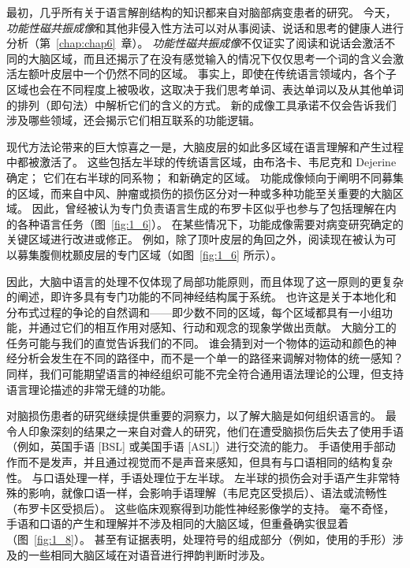 最初，几乎所有关于语言解剖结构的知识都来自对脑部病变患者的研究。
今天，\textit{功能性磁共振成像}和其他非侵入性方法可以对从事阅读、说话和思考的健康人进行分析（第~\ref{chap:chap6}~章）。
\textit{功能性磁共振成像}不仅证实了阅读和说话会激活不同的大脑区域，而且还揭示了在没有感觉输入的情况下仅仅思考一个词的含义会激活左额叶皮层中一个仍然不同的区域。
事实上，即使在传统语言领域内，各个子区域也会在不同程度上被吸收，这取决于我们思考单词、表达单词以及从其他单词的排列（即句法）中解析它们的含义的方式。
新的成像工具承诺不仅会告诉我们涉及哪些领域，还会揭示它们相互联系的功能逻辑。


现代方法论带来的巨大惊喜之一是，大脑皮层的如此多区域在语言理解和产生过程中都被激活了。
这些包括左半球的传统语言区域，由布洛卡、韦尼克和 Dejerine 确定； 它们在右半球的同系物；
和新确定的区域。
功能成像倾向于阐明不同募集的区域，而来自中风、肿瘤或损伤的损伤区分对一种或多种功能至关重要的大脑区域。
因此，曾经被认为专门负责语言生成的布罗卡区似乎也参与了包括理解在内的各种语言任务（图~\ref{fig:1_6}）。
在某些情况下，功能成像需要对病变研究确定的关键区域进行改进或修正。
例如，除了顶叶皮层的角回之外，阅读现在被认为可以募集腹侧枕颞皮层的专门区域（如图~\ref{fig:1_6} 所示）。


因此，大脑中语言的处理不仅体现了局部功能原则，而且体现了这一原则的更复杂的阐述，即许多具有专门功能的不同神经结构属于系统。
也许这是关于本地化和分布式过程的争论的自然调和——即少数不同的区域，每个区域都具有一小组功能，并通过它们的相互作用对感知、行动和观念的现象学做出贡献。
大脑分工的任务可能与我们的直觉告诉我们的不同。
谁会猜到对一个物体的运动和颜色的神经分析会发生在不同的路径中，而不是一个单一的路径来调解对物体的统一感知？
同样，我们可能期望语言的神经组织可能不完全符合通用语法理论的公理，但支持语言理论描述的非常无缝的功能。


对脑损伤患者的研究继续提供重要的洞察力，以了解大脑是如何组织语言的。
最令人印象深刻的结果之一来自对聋人的研究，他们在遭受脑损伤后失去了使用手语（例如，英国手语 [BSL] 或美国手语 [ASL]）进行交流的能力。
手语使用手部动作而不是发声，并且通过视觉而不是声音来感知，但具有与口语相同的结构复杂性。
与口语处理一样，手语处理位于左半球。 左半球的损伤会对手语产生非常特殊的影响，就像口语一样，会影响手语理解（韦尼克区受损后）、语法或流畅性（布罗卡区受损后）。
这些临床观察得到功能性神经影像学的支持。
毫不奇怪，手语和口语的产生和理解并不涉及相同的大脑区域，但重叠确实很显着（图~\ref{fig:1_8}）。
甚至有证据表明，处理符号的组成部分（例如，使用的手形）涉及的一些相同大脑区域在对语音进行押韵判断时涉及。


